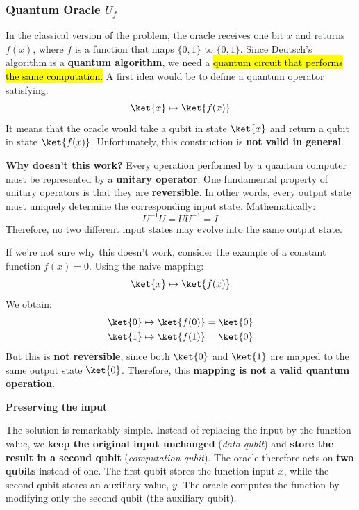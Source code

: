 \subsubsection{Quantum Oracle \texorpdfstring{$U_f$}{Uf}}\label{ex:quantum-oracle-uf}

In the classical version of the problem, the oracle receives one bit $x$ and returns $f(x)$, where $f$ is a function that maps $\{0,1\}$ to $\{0,1\}$. Since Deutsch's algorithm is a \textbf{quantum algorithm}, we need a \hl{quantum circuit that performs the same computation.} A first idea would be to define a quantum operator satisfying:
\begin{equation*}
    \ket{x} \mapsto \ket{f(x)}
\end{equation*}
It means that the oracle would take a qubit in state $\ket{x}$ and return a qubit in state $\ket{f(x)}$. Unfortunately, this construction is \textbf{not valid in general}.

\highspace
\textcolor{Green3}{ \textbf{Why doesn't this work?}} Every operation performed by a quantum computer must be represented by a \textbf{unitary operator}. One fundamental property of unitary operators is that they are \textbf{reversible}. In other words, every output state must uniquely determine the corresponding input state. Mathematically:
\begin{equation*}
    U^{-1}U = UU^{-1} = I
\end{equation*}
Therefore, no two different input states may evolve into the same output state.

\highspace
If we're not sure why this doesn't work, consider the example of a constant function $f(x) = 0$. Using the naive mapping:
\begin{equation*}
    \ket{x} \mapsto \ket{f(x)}
\end{equation*}
\textcolor{Red2}{} We obtain:
\begin{align*}
    \ket{0} &\mapsto \ket{f(0)} = \ket{0} \\
    \ket{1} &\mapsto \ket{f(1)} = \ket{0}
\end{align*}
But this is \textbf{not reversible}, since both $\ket{0}$ and $\ket{1}$ are mapped to the same output state $\ket{0}$. Therefore, this \textbf{mapping is not a valid quantum operation}.

\highspace
\begin{flushleft}
    \textcolor{Green3}{ \textbf{Preserving the input}}
\end{flushleft}
The solution is remarkably simple. Instead of replacing the input by the function value, we \textbf{keep the original input unchanged} (\emph{data qubit}) and \textbf{store the result in a second qubit} (\emph{computation qubit}). The oracle therefore acts on \textbf{two qubits} instead of one. The first qubit stores the function input $x$, while the second qubit stores an auxiliary value, $y$. The oracle computes the function by modifying only the second qubit (the auxiliary qubit).

